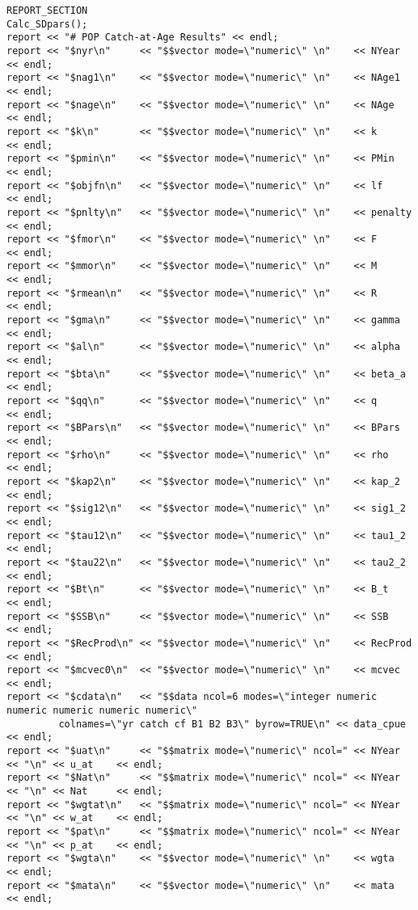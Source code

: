 \documentclass[letterpaper,12pt,fleqn]{article}
\begin{document}
\begin{Verbatim}[formatcom=\color{slategrey},fontsize=\footnotesize]
REPORT_SECTION
Calc_SDpars();
report << "# POP Catch-at-Age Results" << endl;
report << "$nyr\n"     << "$$vector mode=\"numeric\" \n"    << NYear   << endl;
report << "$nag1\n"    << "$$vector mode=\"numeric\" \n"    << NAge1   << endl;
report << "$nage\n"    << "$$vector mode=\"numeric\" \n"    << NAge    << endl;
report << "$k\n"       << "$$vector mode=\"numeric\" \n"    << k       << endl;
report << "$pmin\n"    << "$$vector mode=\"numeric\" \n"    << PMin    << endl;
report << "$objfn\n"   << "$$vector mode=\"numeric\" \n"    << lf      << endl;
report << "$pnlty\n"   << "$$vector mode=\"numeric\" \n"    << penalty << endl;
report << "$fmor\n"    << "$$vector mode=\"numeric\" \n"    << F       << endl;
report << "$mmor\n"    << "$$vector mode=\"numeric\" \n"    << M       << endl;
report << "$rmean\n"   << "$$vector mode=\"numeric\" \n"    << R       << endl;
report << "$gma\n"     << "$$vector mode=\"numeric\" \n"    << gamma   << endl;
report << "$al\n"      << "$$vector mode=\"numeric\" \n"    << alpha   << endl;
report << "$bta\n"     << "$$vector mode=\"numeric\" \n"    << beta_a  << endl;
report << "$qq\n"      << "$$vector mode=\"numeric\" \n"    << q       << endl;
report << "$BPars\n"   << "$$vector mode=\"numeric\" \n"    << BPars   << endl;
report << "$rho\n"     << "$$vector mode=\"numeric\" \n"    << rho     << endl;
report << "$kap2\n"    << "$$vector mode=\"numeric\" \n"    << kap_2   << endl;
report << "$sig12\n"   << "$$vector mode=\"numeric\" \n"    << sig1_2  << endl;
report << "$tau12\n"   << "$$vector mode=\"numeric\" \n"    << tau1_2  << endl;
report << "$tau22\n"   << "$$vector mode=\"numeric\" \n"    << tau2_2  << endl;
report << "$Bt\n"      << "$$vector mode=\"numeric\" \n"    << B_t     << endl;
report << "$SSB\n"     << "$$vector mode=\"numeric\" \n"    << SSB     << endl;
report << "$RecProd\n" << "$$vector mode=\"numeric\" \n"    << RecProd << endl;
report << "$mcvec0\n"  << "$$vector mode=\"numeric\" \n"    << mcvec   << endl;
report << "$cdata\n"   << "$$data ncol=6 modes=\"integer numeric numeric numeric numeric numeric\"
         colnames=\"yr catch cf B1 B2 B3\" byrow=TRUE\n" << data_cpue  << endl;
report << "$uat\n"     << "$$matrix mode=\"numeric\" ncol=" << NYear << "\n" << u_at    << endl;
report << "$Nat\n"     << "$$matrix mode=\"numeric\" ncol=" << NYear << "\n" << Nat     << endl;
report << "$wgtat\n"   << "$$matrix mode=\"numeric\" ncol=" << NYear << "\n" << w_at    << endl;
report << "$pat\n"     << "$$matrix mode=\"numeric\" ncol=" << NYear << "\n" << p_at    << endl;
report << "$wgta\n"    << "$$vector mode=\"numeric\" \n"    << wgta    << endl;
report << "$mata\n"    << "$$vector mode=\"numeric\" \n"    << mata    << endl;
\end{Verbatim}
\end{document}
